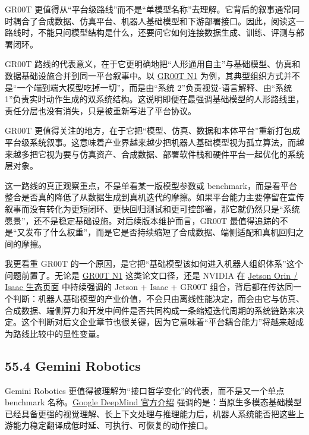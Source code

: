 GR00T 更值得从“平台级路线”而不是“单模型名称”去理解。它背后的叙事通常同时耦合了合成数据、仿真平台、机器人基础模型和下游部署接口。因此，阅读这一路线时，不能只问模型结构是什么，还要问它如何连接数据生成、训练、评测与部署闭环。

GR00T 路线的代表意义，在于它更明确地把“人形通用自主”与基础模型、仿真和数据基础设施合并到同一平台叙事中。以 \href{https://arxiv.org/abs/2503.14734}{GR00T N1} 为例，其典型组织方式并不是“一个端到端大模型吃掉一切”，而是由“系统 2”负责视觉-语言解释、由“系统 1”负责实时动作生成的双系统结构。这说明即便在最强调基础模型的人形路线里，责任分层也没有消失，只是被重新写进了平台协议。

GR00T 更值得关注的地方，在于它把“模型、仿真、数据和本体平台”重新打包成平台级系统叙事。这意味着产业界越来越少把机器人基础模型视为孤立算法，而越来越多把它视为要与仿真资产、合成数据、部署软件栈和硬件平台一起优化的系统层对象。

这一路线的真正观察重点，不是单看某一版模型参数或 benchmark，而是看平台整合是否真的降低了从数据生成到真机迭代的摩擦。如果平台能力主要停留在宣传叙事而没有转化为更短闭环、更快回归测试和更可控部署，那它就仍然只是“系统愿景”，还不是稳定基础设施。对后续版本维护而言，GR00T 最值得追踪的不是“又发布了什么权重”，而是它是否持续缩短了合成数据、端侧适配和真机回归之间的摩擦。

我更看重 GR00T 的一个原因，是它把“基础模型该如何进入机器人组织体系”这个问题前置了。无论是 \href{https://arxiv.org/abs/2503.14734}{GR00T N1} 这类论文口径，还是 NVIDIA 在 \href{https://www.nvidia.com/en-us/autonomous-machines/embedded-systems/jetson-orin/}{Jetson Orin / Isaac 生态页面} 中持续强调的 Jetson + Isaac + GR00T 组合，背后都在传达同一个判断：机器人基础模型的产业价值，不会只由离线性能决定，而会由它与仿真、合成数据、端侧算力和开发中间件是否共同构成一条缩短迭代周期的系统链路来决定。这个判断对后文企业章节也很关键，因为它意味着“平台耦合能力”将越来越成为路线比较中的显性变量。

\subsection*{55.4 Gemini Robotics}


Gemini Robotics 更值得被理解为“接口哲学变化”的代表，而不是又一个单点 benchmark 名称。\href{https://deepmind.google/discover/blog/gemini-robotics-brings-ai-into-the-physical-world/}{Google DeepMind 官方介绍} 强调的是：当原生多模态基础模型已经具备更强的视觉理解、长上下文处理与推理能力后，机器人系统能否把这些上游能力稳定翻译成低时延、可执行、可恢复的动作接口。

